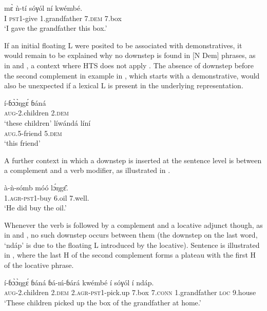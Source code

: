 \documentclass[output=paper,newtxmath,modfonts,nonflat,hidelinks]{langsci/langscibook}
\begin{document}
\ea \gll  m\`ɛ ǹ-tí sóγól ní {\↓}kwémbé.\\
I \textsc{pst1}-give 1.grandfather 7.\textsc{dem} 7.box\\
\glt `I gave the grandfather this box.'\label{ex:HamlaouiMakasso:12}
\z

\noindent If an initial floating L  were posited to be associated with demonstratives, it would remain to be explained why no downstep is found in [N Dem] phrases, as in  and  \citep[273]{Hyman03}, a context where HTS does not apply \citep[28]{HamlaouiEtAl14}. The absence of downstep before the second complement in example  in , which starts with a demonstrative, would also be unexpected if a lexical L  is present in the underlying representation.

\ea \label{ex:HamlaouiMakasso:13}
 \gll í-ɓ\`ɔ\`ɔŋg\'ɛ ɓ{á}n{á}\\
\textsc{aug}-2.children 2.\textsc{dem}\\
\glt `these children'
\ex \gll lí{\↓}w{á}nd{á} líní\\
\textsc{aug}.5-friend 5.\textsc{dem}\\
\glt `this friend'\label{ex:HamlaouiMakasso:13b}
\z

A further context in which a downstep is inserted at the sentence level is between a complement and a verb modifier, as illustrated in .

\ea \gll à-ǹ-sómb móó {\↓}l\'ɔŋg\^ɛ.\\
1.\textsc{agr}-\textsc{pst1}-buy 6.oil 7.well.\\
\glt `He did buy the oil.'\label{ex:HamlaouiMakasso:14}
\z

Whenever the verb is followed by a complement and a locative adjunct though, as in  and , no such downstep occurs between them (the downstep on the last word, `nd{á}p' is due to the floating L introduced by the locative). Sentence  is illustrated in , where the last H  of the second complement forms a plateau with the first H  of the locative phrase.

\ea  \gll í-ɓ\`ɔ\`ɔŋg\'ɛ ɓ{á}n{á} ɓ{á}-\'m-ɓ{á}r{á} kwémbé í sóγól í {\↓}nd{á}p.\\
\textsc{aug}-2.children 2.\textsc{dem} 2.\textsc{agr}-\textsc{pst1}-pick.up 7.box 7.\textsc{conn} 1.grandfather \textsc{loc} 9.house\\
\glt `These children picked up the box of the grandfather at home.'\label{ex:HamlaouiMakasso:15}
\z
\end{document}
